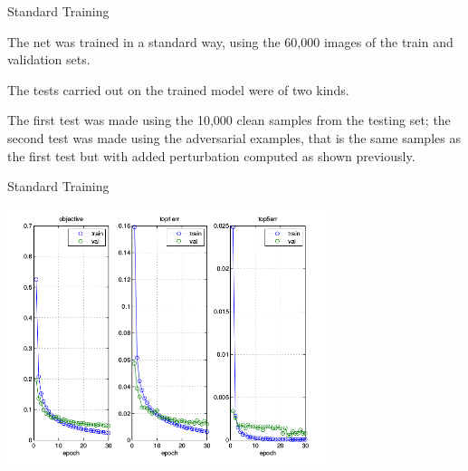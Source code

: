 \begin{tframe}{Standard Training}

The net was trained in a standard way, using the 60,000 images of the train and validation sets.

\vspace{0.1in}

The tests carried out on the trained model were of two kinds. 

\vspace{0.1in}

The first test was made using the 10,000 clean samples from the testing set; the second test was made using the adversarial examples, that is the same samples as the first test but with added perturbation computed as shown previously.

\end{tframe}

\begin{tframe}{Standard Training}

\begin{center}
  \includegraphics[width=0.7\textwidth]{img/train-base.png}
	\label{train-base} 
\end{center}
\end{tframe}

